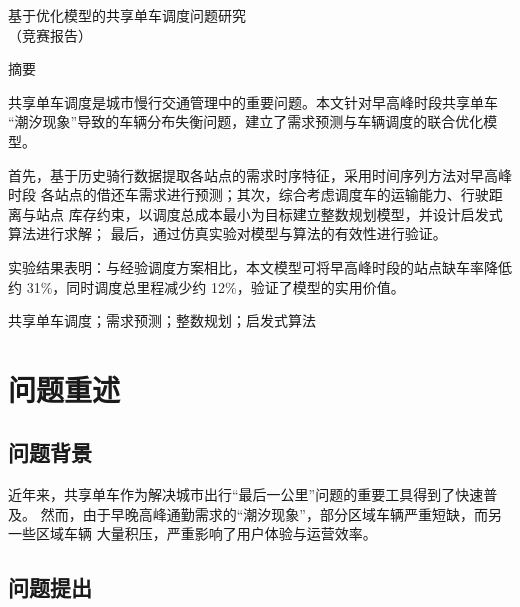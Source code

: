 \documentclass[zihao=-4,a4paper]{ctexart}
\begin{document}
\thispagestyle{empty}

\begin{center}
  {\heiti 基于优化模型的共享单车调度问题研究}\\[1.0em]
  {（竞赛报告）}
\end{center}

\vspace{0.6em}
\begin{center}
  {\heiti 摘\quad\quad 要}
\end{center}

\quad 共享单车调度是城市慢行交通管理中的重要问题。本文针对早高峰时段共享单车
“潮汐现象”导致的车辆分布失衡问题，建立了需求预测与车辆调度的联合优化模型。

首先，基于历史骑行数据提取各站点的需求时序特征，采用时间序列方法对早高峰时段
各站点的借还车需求进行预测；其次，综合考虑调度车的运输能力、行驶距离与站点
库存约束，以调度总成本最小为目标建立整数规划模型，并设计启发式算法进行求解；
最后，通过仿真实验对模型与算法的有效性进行验证。

实验结果表明：与经验调度方案相比，本文模型可将早高峰时段的站点缺车率降低约
31\%，同时调度总里程减少约 12\%，验证了模型的实用价值。

\vspace{0.6em}
共享单车调度；需求预测；整数规划；启发式算法

\newpage

\section{问题重述}

\subsection{问题背景}

\quad 近年来，共享单车作为解决城市出行“最后一公里”问题的重要工具得到了快速普及。
然而，由于早晚高峰通勤需求的“潮汐现象”，部分区域车辆严重短缺，而另一些区域车辆
大量积压，严重影响了用户体验与运营效率。

\subsection{问题提出}
\end{document}
